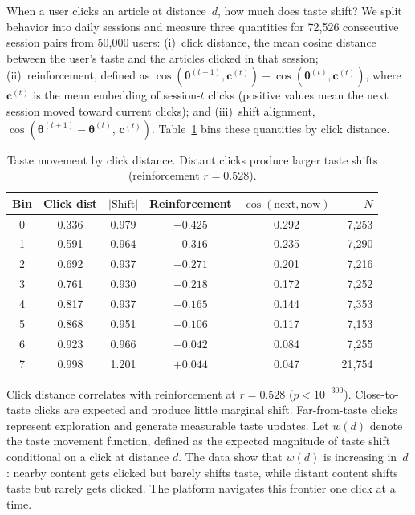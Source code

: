 \documentclass[11pt]{article}
\begin{document}
When a user clicks an article at distance~$d$, how much does taste shift? We split behavior into daily sessions and measure three quantities for 72,526 consecutive session pairs from 50,000 users: (i)~click distance, the mean cosine distance between the user's taste and the articles clicked in that session; (ii)~reinforcement, defined as $\cos(\boldsymbol{\theta}^{(t+1)}, \mathbf{c}^{(t)}) - \cos(\boldsymbol{\theta}^{(t)}, \mathbf{c}^{(t)})$, where $\mathbf{c}^{(t)}$ is the mean embedding of session-$t$ clicks (positive values mean the next session moved toward current clicks); and (iii)~shift alignment, $\cos(\boldsymbol{\theta}^{(t+1)} - \boldsymbol{\theta}^{(t)},\, \mathbf{c}^{(t)})$. Table~\ref{tab:movement} bins these quantities by click distance.

\begin{table}[ht]
\centering
\caption{Taste movement by click distance. Distant clicks produce larger taste shifts (reinforcement $r = 0.528$).}
\label{tab:movement}
\begin{tabular}{cccccr}
\toprule
Bin & Click dist & $|\text{Shift}|$ & Reinforcement & $\cos(\text{next}, \text{now})$ & $N$ \\
\midrule
0 & 0.336 & 0.979 & $-0.425$ & 0.292 & 7,253 \\
1 & 0.591 & 0.964 & $-0.316$ & 0.235 & 7,290 \\
2 & 0.692 & 0.937 & $-0.271$ & 0.201 & 7,216 \\
3 & 0.761 & 0.930 & $-0.218$ & 0.172 & 7,252 \\
4 & 0.817 & 0.937 & $-0.165$ & 0.144 & 7,353 \\
5 & 0.868 & 0.951 & $-0.106$ & 0.117 & 7,153 \\
6 & 0.923 & 0.966 & $-0.042$ & 0.084 & 7,255 \\
7 & 0.998 & 1.201 & $+0.044$ & 0.047 & 21,754 \\
\bottomrule
\end{tabular}
\end{table}
\FloatBarrier

Click distance correlates with reinforcement at $r = 0.528$ ($p < 10^{-300}$). Close-to-taste clicks are expected and produce little marginal shift. Far-from-taste clicks represent exploration and generate measurable taste updates. Let $w(d)$ denote the taste movement function, defined as the expected magnitude of taste shift conditional on a click at distance $d$. The data show that $w(d)$ is increasing in~$d$: nearby content gets clicked but barely shifts taste, while distant content shifts taste but rarely gets clicked. The platform navigates this frontier one click at a time.
\end{document}
